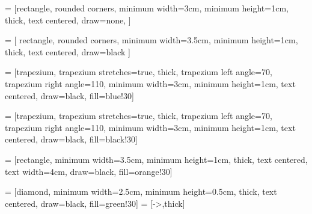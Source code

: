 \usetikzlibrary{shapes.geometric, arrows}

 = [rectangle, rounded corners,
minimum width=3cm,
minimum height=1cm,
thick,
text centered,
draw=none,
]

 = [
rectangle,
rounded corners,
minimum width=3.5cm,
minimum height=1cm,
thick,
text centered,
draw=black
]

 = [trapezium,
trapezium stretches=true, %
thick,
trapezium left angle=70,
trapezium right angle=110,
minimum width=3cm,
minimum height=1cm, text centered,
draw=black, fill=blue!30]

 = [trapezium,
trapezium stretches=true, %
thick,
trapezium left angle=70,
trapezium right angle=110,
minimum width=3cm,
minimum height=1cm, text centered,
draw=black, fill=black!30]

 = [rectangle,
minimum width=3.5cm,
minimum height=1cm,
thick,
text centered,
text width=4cm,
draw=black,
fill=orange!30]

 = [diamond,
minimum width=2.5cm,
minimum height=0.5cm,
thick,
text centered,
draw=black,
fill=green!30]
 = [->,thick]


\usepackage{sankey}
\usepackage{wrapfig}
